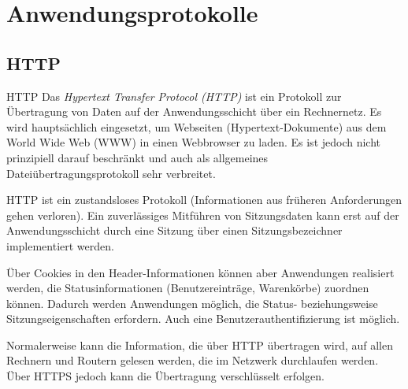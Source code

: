 \section{Anwendungsprotokolle}

\subsection{HTTP}

\begin{defi}{HTTP}
    Das \emph{Hypertext Transfer Protocol (HTTP)} ist ein Protokoll zur Übertragung von Daten auf der Anwendungsschicht über ein Rechnernetz.
    Es wird hauptsächlich eingesetzt, um Webseiten (Hypertext-Dokumente) aus dem World Wide Web (WWW) in einen Webbrowser zu laden.
    Es ist jedoch nicht prinzipiell darauf beschränkt und auch als allgemeines Dateiübertragungsprotokoll sehr verbreitet.

    HTTP ist ein zustandsloses Protokoll (Informationen aus früheren Anforderungen gehen verloren).
    Ein zuverlässiges Mitführen von Sitzungsdaten kann erst auf der Anwendungsschicht durch eine Sitzung über einen Sitzungsbezeichner implementiert werden.

    Über Cookies in den Header-Informationen können aber Anwendungen realisiert werden, die Statusinformationen (Benutzereinträge, Warenkörbe) zuordnen können.
    Dadurch werden Anwendungen möglich, die Status- beziehungsweise Sitzungseigenschaften erfordern.
    Auch eine Benutzerauthentifizierung ist möglich.

    Normalerweise kann die Information, die über HTTP übertragen wird, auf allen Rechnern und Routern gelesen werden, die im Netzwerk durchlaufen werden.
    Über HTTPS jedoch kann die Übertragung verschlüsselt erfolgen.
\end{defi}

